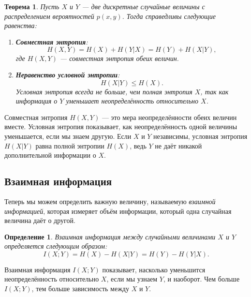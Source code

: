\documentclass[12pt,a4paper]{article}
\newtheorem{theorem}{Теорема}[section]
\newenvironment{thmbox}[1][]{%
  \begin{tcolorbox}[enhanced, breakable, colback=thmcolor, colframe=blue!50!black, title=#1, fonttitle=\bfseries, arc=3pt, boxrule=0.5pt]
}{\end{tcolorbox}}
\newtheorem{definition}{Определение}[section]
\newenvironment{defbox}[1][]{%
  \begin{tcolorbox}[enhanced, breakable, colback=defcolor, colframe=green!50!black, title=#1, fonttitle=\bfseries, arc=3pt, boxrule=0.5pt]
}{\end{tcolorbox}}
\newenvironment{rembox}[1][]{%
  \begin{tcolorbox}[enhanced, breakable, colback=gray!5, colframe=gray!50, title=#1, fonttitle=\bfseries, arc=3pt, boxrule=0.5pt]
}{\end{tcolorbox}}
\begin{document}
\begin{thmbox}[Основные равенства для совместной и условной энтропии]
\begin{theorem}
Пусть $X$ и $Y$ — две дискретные случайные величины с распределением вероятностей $p(x,y)$. Тогда справедливы следующие равенства:
\begin{enumerate}
    \item \textbf{Совместная энтропия}:
    \[
    H(X,Y) = H(X) + H(Y|X) = H(Y) + H(X|Y),
    \]
    где $H(X,Y)$ — совместная энтропия обеих величин.
    
    \item \textbf{Неравенство условной энтропии}:
    \[
    H(X|Y) \leq H(X).
    \]
    Условная энтропия всегда не больше, чем полная энтропия $X$, так как информация о $Y$ уменьшает неопределённость относительно $X$.
\end{enumerate}
\end{theorem}
\end{thmbox}

\begin{rembox}[Интуитивное объяснение]
Совместная энтропия $H(X,Y)$ — это мера неопределённости обеих величин вместе. Условная энтропия показывает, как неопределённость одной величины уменьшается, если мы знаем другую. Если $X$ и $Y$ независимы, условная энтропия $H(X|Y)$ равна полной энтропии $H(X)$, ведь $Y$ не даёт никакой дополнительной информации о $X$.
\end{rembox}

\subsection{Взаимная информация}

Теперь мы можем определить важную величину, называемую \textit{взаимной информацией}, которая измеряет объём информации, который одна случайная величина даёт о другой.

\begin{defbox}[Взаимная информация]
\begin{definition}
Взаимная информация между случайными величинами $X$ и $Y$ определяется следующим образом:
\[
I(X; Y) = H(X) - H(X|Y) = H(Y) - H(Y|X).
\]
\end{definition}
\end{defbox}

\begin{rembox}[Смысл взаимной информации]
Взаимная информация $I(X; Y)$ показывает, насколько уменьшится неопределённость относительно $X$, если мы узнаем $Y$, и наоборот. Чем больше $I(X; Y)$, тем больше зависимость между $X$ и $Y$.
\end{rembox}
\end{document}
